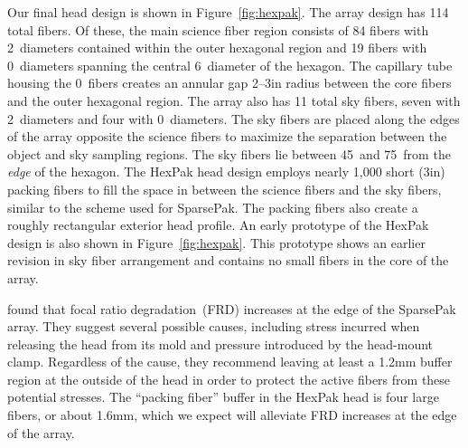 Our final head design is shown in Figure~\ref{fig:hexpak}.  The array design
has 114 total fibers.  Of these, the main science fiber region consists of 84
fibers with 2\ diameters contained within the outer hexagonal region
and 19 fibers with 0\ diameters spanning the central
6\arcsec\ diameter of the hexagon.  The capillary tube housing the
0\ fibers creates an annular gap 2--3\arcsec in radius between the
core fibers and the outer hexagonal region.  The array also has 11 total sky
fibers, seven with 2\ diameters and four with 0\ diameters.
The sky fibers are placed along the edges of the array opposite the science
fibers to maximize the separation between the object and sky sampling regions.
The sky fibers lie between 45\arcsec\ and 75\arcsec\ from the \emph{edge} of
the hexagon.  The HexPak head design employs nearly 1,000 short (3in) packing
fibers to fill the space in between the science fibers and the sky fibers,
similar to the scheme used for SparsePak.  The packing fibers also create a
roughly rectangular exterior head profile.  An early prototype of the HexPak
design is also shown in Figure~\ref{fig:hexpak}.  This prototype shows an
earlier revision in sky fiber arrangement and contains no small fibers in the
core of the array.


\citet{Bershady04} found that focal ratio
degradation\footnotemark\ (FRD) increases at the edge of the SparsePak array.
  They suggest several possible causes,
including stress incurred when releasing the head from its mold and pressure
introduced by the head-mount clamp.  Regardless of the cause, they recommend
leaving at least a 1.2mm buffer region at the outside of the head in order to
protect the active fibers from these potential stresses.  The ``packing
fiber'' buffer in the HexPak head is four large fibers, or about 1.6mm, which
we expect will alleviate FRD increases at the edge of the array.


\subsubsection{\GP}
\label{GPBsubsub:sec:gradhead}

